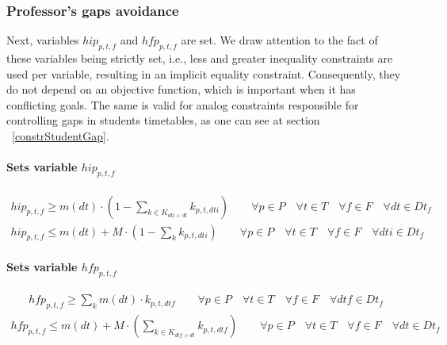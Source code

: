 \subsubsection{Professor's gaps avoidance}
\label{constrProfessorGap}

Next, variables $hip_{p,t,f}$ and $hfp_{p,t,f}$ are set. We draw attention to the fact of these variables being strictly set, i.e., less and greater inequality constraints are used per variable, resulting in an implicit equality constraint. Consequently, they do not depend on an objective function, which is important when it has conflicting goals. The same is valid for analog constraints responsible for controlling gaps in students timetables, as one can see at section ~\ref{constrStudentGap}.  

\paragraph{Sets variable $hip_{p,t,f}$}
\begin{eqnarray}
hip_{p,t,f} \geq m(dt) \cdot ( 1 - \sum\limits_{k \in K_{dti<dt}} k_{p,t,dti} ) \nonumber \qquad
\forall p \in P \quad
\forall t \in T \quad
\forall f \in F \quad
\forall dt \in Dt_{f}
\end{eqnarray}
\begin{eqnarray}
hip_{p,t,f} \leq m(dt) + M \cdot ( 1 - \sum\limits_{k} k_{p,t,dti} ) \nonumber \qquad
\forall p \in P \quad
\forall t \in T \quad
\forall f \in F \quad
\forall dti \in Dt_{f}
\end{eqnarray}

\paragraph{Sets variable $hfp_{p,t,f}$}
\begin{eqnarray}
hfp_{p,t,f} \geq \sum\limits_{k} m(dt) \cdot k_{p,t,dtf} \nonumber \qquad
\forall p \in P \quad
\forall t \in T \quad
\forall f \in F \quad
\forall dtf \in Dt_{f}
\end{eqnarray}
\begin{eqnarray}
hfp_{p,t,f} \leq m(dt) + M \cdot ( \sum\limits_{k \in K_{dtf>dt}} k_{p,t,dtf} ) \nonumber \qquad
\forall p \in P \quad
\forall t \in T \quad
\forall f \in F \quad
\forall dt \in Dt_{f}
\end{eqnarray}

